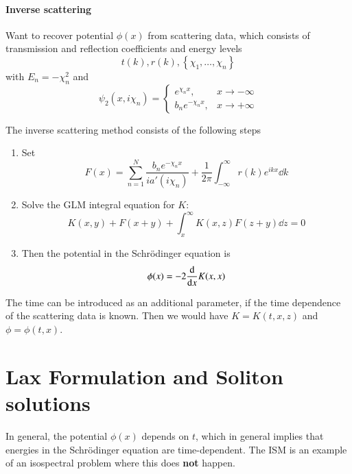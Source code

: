 \paragraph{Inverse scattering}
Want to recover potential $\phi(x)$ from scattering data, which consists of transmission and reflection coefficients and energy levels
\begin{equation*}
	t(k), r(k), \left\{ \chi_1, \dots, \chi_n \right\} 
\end{equation*}
with $E_n = -\chi_n^2$ and
\begin{equation*}
	\psi_2 ( x, i\chi_n) = 
	\begin{cases}
		e^{\chi_n x}, & x \rightarrow -\infty \\
		b_n e^{-\chi_n x}, & x\rightarrow + \infty
	\end{cases}
\end{equation*}

The inverse scattering method consists of the following steps
\begin{enumerate}
	\item Set 
		\begin{equation}
			F(x) = \sum_{n=1}^{N} \frac{b_n e^{-\chi_n x}}{i a'(i\chi_n)} + \frac{1}{2\pi} \int_{-\infty}^{\infty} r(k) e^{ikx} \dd{k}
			\label{math:def_Fx}
		\end{equation}
	\item Solve the GLM integral equation for $K$:
		\begin{equation}
			K(x, y) + F(x + y) + \int_{x}^{\infty} K(x,z) F(z+y) \dd{z} = 0
			\label{math:GLM}
		\end{equation}
	\item Then the potential in the Schrödinger equation is 
		\begin{equation}
			\phi(x) = -2 \dv{x}  K(x,x)
			\label{math:inv_scatter_pot}
		\end{equation}
\end{enumerate}
The time can be introduced as an additional parameter, if the time dependence of the scattering data is known. Then we would have $K = K(t, x, z)$ and $\phi = \phi(t, x)$.

\section{Lax Formulation and Soliton solutions}
In general, the potential $\phi(x)$ depends on $t$, which in general implies that energies in the Schrödinger equation are time-dependent. The ISM is an example of an isospectral problem where this does \textbf{not} happen.

